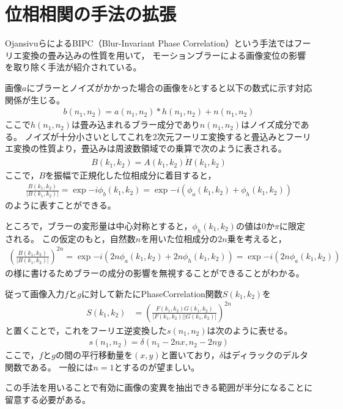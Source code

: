 \documentclass[fleqn]{jreport}
\begin{document}
\chapter{位相相関の手法の拡張}
OjansivuらによるBIPC（Blur-Invariant Phase Correlation）という手法ではフーリエ変換の畳み込みの性質を用いて，
モーションブラーによる画像変位の影響を取り除く手法が紹介されている。


画像$a$にブラーとノイズがかかった場合の画像を$b$とすると以下の数式に示す対応関係が生じる。
\begin{align}
b(n_1,n_2) = a(n_1,n_2) * h(n_1,n_2) + n(n_1,n_2)
\end{align}
ここで$h(n_1,n_2)$は畳み込まれるブラー成分であり$n(n_1,n_2)$はノイズ成分である。
ノイズが十分小さいとしてこれを2次元フーリエ変換すると畳込みとフーリエ変換の性質より，畳込みは周波数領域での乗算で次のように表される。
\begin{align}
B(k_1,k_2) = A(k_1,k_2) \dot  H(k_1,k_2)
\end{align}
ここで，$B$を振幅で正規化した位相成分に着目すると，
\begin{align}
\frac{B(k_1,k_2)}{|B(k_1,k_2)|} = \exp{-i\phi_b(k_1,k_2)}= \exp{-i(\phi_a(k_1,k_2) +\phi_h(k_1,k_2))}
\end{align}
のように表すことができる。


ところで，ブラーの変形量は中心対称とすると，$\phi_h(k_1,k_2)$の値は$0$か$\pi$に限定される。
この仮定のもと，自然数$n$を用いた位相成分の$2n$乗を考えると，
\begin{align}
\left( \frac{B(k_1,k_2)}{|B(k_1,k_2)|} \right)^{2n} =  \exp{-i(2n\phi_a(k_1,k_2) +2n\phi_h(k_1,k_2))} = \exp{-i (2n\phi_a(k_1,k_2))}
\end{align}
の様に書けるためブラーの成分の影響を無視することができることがわかる。

従って画像入力$f$と$g$に対して新たにPhaseCorrelation関数$S(k_1,k_2)$を
\begin{align}
S(k_1,k_2) &= \left( \frac{F(k_1,k_2)\bar{G(k_1,k_2)}}{|F(k_1,k_2)||G(k_1,k_2)|} \right)^{2n}
\end{align}
と置くことで，これをフーリエ逆変換した$s(n_1,n_2)$は次のように表せる。
\begin{align}
s(n_1,n_2) = \delta(n_1-2nx,n_2-2ny)
\end{align}
ここで，$f$と$g$の間の平行移動量を$(x,y)$と置いており，$\delta$はディラックのデルタ関数である。
一般には$n=1$とするのが望ましい。

この手法を用いることで有効に画像の変異を抽出できる範囲が半分になることに留意する必要がある。
\end{document}
